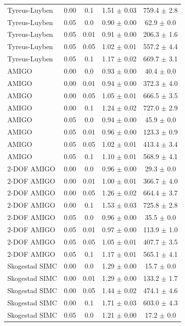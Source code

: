 \begin{table}[t]
{\begin{tabular}{lcccc}
Tyreus-Luyben & 0.00 & 0.1 & 1.51 $\pm$ 0.03 & 759.4 $\pm$ 2.8 \\
Tyreus-Luyben & 0.05 & 0.0 & 0.90 $\pm$ 0.00 & 62.9 $\pm$ 0.0 \\
Tyreus-Luyben & 0.05 & 0.01 & 0.91 $\pm$ 0.00 & 206.3 $\pm$ 1.6 \\
Tyreus-Luyben & 0.05 & 0.05 & 1.02 $\pm$ 0.01 & 557.2 $\pm$ 4.4 \\
Tyreus-Luyben & 0.05 & 0.1 & 1.17 $\pm$ 0.02 & 669.7 $\pm$ 3.1 \\
AMIGO & 0.00 & 0.0 & 0.93 $\pm$ 0.00 & 40.4 $\pm$ 0.0 \\
AMIGO & 0.00 & 0.01 & 0.94 $\pm$ 0.00 & 372.3 $\pm$ 4.0 \\
AMIGO & 0.00 & 0.05 & 1.05 $\pm$ 0.01 & 666.5 $\pm$ 3.5 \\
AMIGO & 0.00 & 0.1 & 1.24 $\pm$ 0.02 & 727.0 $\pm$ 2.9 \\
AMIGO & 0.05 & 0.0 & 0.94 $\pm$ 0.00 & 45.9 $\pm$ 0.0 \\
AMIGO & 0.05 & 0.01 & 0.96 $\pm$ 0.00 & 123.3 $\pm$ 0.9 \\
AMIGO & 0.05 & 0.05 & 1.02 $\pm$ 0.01 & 413.4 $\pm$ 3.4 \\
AMIGO & 0.05 & 0.1 & 1.10 $\pm$ 0.01 & 568.9 $\pm$ 4.1 \\
2-DOF AMIGO & 0.00 & 0.0 & 0.96 $\pm$ 0.00 & 29.3 $\pm$ 0.0 \\
2-DOF AMIGO & 0.00 & 0.01 & 1.00 $\pm$ 0.01 & 366.7 $\pm$ 4.0 \\
2-DOF AMIGO & 0.00 & 0.05 & 1.26 $\pm$ 0.02 & 664.4 $\pm$ 3.7 \\
2-DOF AMIGO & 0.00 & 0.1 & 1.53 $\pm$ 0.03 & 725.8 $\pm$ 2.8 \\
2-DOF AMIGO & 0.05 & 0.0 & 0.96 $\pm$ 0.00 & 35.5 $\pm$ 0.0 \\
2-DOF AMIGO & 0.05 & 0.01 & 0.97 $\pm$ 0.00 & 113.9 $\pm$ 1.0 \\
2-DOF AMIGO & 0.05 & 0.05 & 1.05 $\pm$ 0.01 & 407.7 $\pm$ 3.5 \\
2-DOF AMIGO & 0.05 & 0.1 & 1.17 $\pm$ 0.01 & 565.1 $\pm$ 4.1 \\
Skogestad SIMC & 0.00 & 0.0 & 1.29 $\pm$ 0.00 & 15.7 $\pm$ 0.0 \\
Skogestad SIMC & 0.00 & 0.01 & 1.29 $\pm$ 0.00 & 133.2 $\pm$ 1.7 \\
Skogestad SIMC & 0.00 & 0.05 & 1.44 $\pm$ 0.02 & 474.1 $\pm$ 4.6 \\
Skogestad SIMC & 0.00 & 0.1 & 1.71 $\pm$ 0.03 & 603.0 $\pm$ 4.3 \\
Skogestad SIMC & 0.05 & 0.0 & 1.21 $\pm$ 0.00 & 17.2 $\pm$ 0.0 \\

\end{tabular}}
\end{table}

